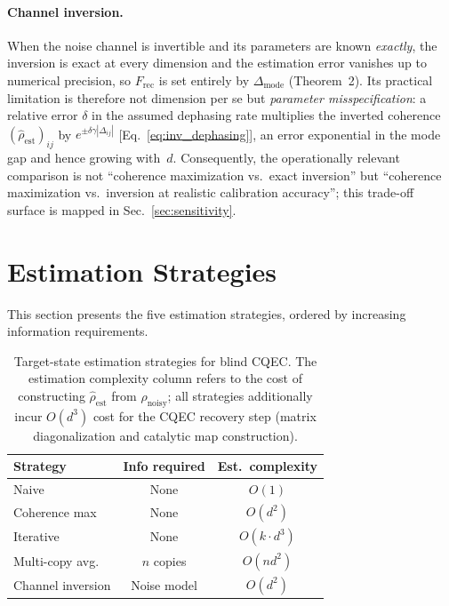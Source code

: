 \documentclass[12pt,a4paper]{article}
\newcommand{\Frec}{F_\mathrm{rec}}
\newcommand{\rhon}{\rho_\mathrm{noisy}}
\newcommand{\rhoe}{\hat{\rho}_\mathrm{est}}
\begin{document}
\paragraph{Channel inversion.}
When the noise channel is invertible and its parameters are known \emph{exactly}, the inversion is exact at every dimension and the estimation error vanishes up to numerical precision, so $\Frec$ is set entirely by $\Delta_{\mathrm{mode}}$ (Theorem~2).
Its practical limitation is therefore not dimension per se but \emph{parameter misspecification}: a relative error $\delta$ in the assumed dephasing rate multiplies the inverted coherence $(\rhoe)_{ij}$ by $e^{\pm\delta\gamma|\Delta_{ij}|}$ [Eq.~\eqref{eq:inv_dephasing}], an error exponential in the mode gap and hence growing with~$d$.
Consequently, the operationally relevant comparison is not ``coherence maximization vs.\ exact inversion'' but ``coherence maximization vs.\ inversion at realistic calibration accuracy''; this trade-off surface is mapped in Sec.~\ref{sec:sensitivity}.


\section{Estimation Strategies}
\label{sec:strategies}

This section presents the five estimation strategies, ordered by increasing information requirements.

\begin{table}[b]
\caption{Target-state estimation strategies for blind CQEC.
The estimation complexity column refers to the cost of constructing $\rhoe$ from $\rhon$; all strategies additionally incur $O(d^3)$ cost for the CQEC recovery step (matrix diagonalization and catalytic map construction).}
\label{tab:strategies}

\begin{tabular}{lcc}
Strategy & Info required & Est.\ complexity \\
\hline
Naive & None & $O(1)$ \\
Coherence max & None & $O(d^2)$ \\
Iterative & None & $O(k \cdot d^3)$ \\
Multi-copy avg. & $n$ copies & $O(n d^2)$ \\
Channel inversion & Noise model & $O(d^2)$ \\
\end{tabular}

\end{table}
\end{document}
